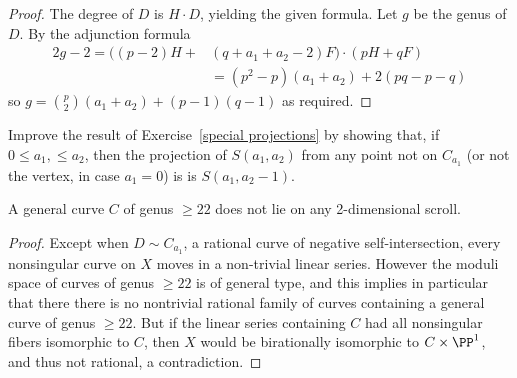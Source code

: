 \begin{proof} The degree of $D$ is $H\cdot D$, yielding the given formula. Let $g$ be the genus of $D$. 
By the adjunction formula
\begin{align*}
2g-2 =  \bigl((p-2)H+&(q+a_{1}+a_{2}-2)F\bigr)\cdot (pH+qF)\\ 
 &= (p^{2}-p)(a_{1}+a_{2})+2(pq-p-q)
\end{align*}
so $g = {p\choose 2}(a_{1}+a_{2}) + (p-1)(q-1)$ as required.
\end{proof}

\begin{exercise}\label{general projections}
Improve the result of Exercise~\ref{special projections} by showing that, if $0\leq a_1,\leq a_2$, then
 the projection of $S(a_1,a_2)$ from any point not on $C_{a_1}$ (or not the vertex, in case $a_1=0$) is 
 is $S(a_1, a_2-1)$.
\end{exercise}
\begin{fact}
A general curve $C$ of  genus $\geq 22$ does not lie on any 2-dimensional scroll.
\end{fact}
\begin{proof}
Except when $D\sim C_{a_{1}}$, a rational curve of negative self-intersection, every nonsingular curve on $X$ moves in a non-trivial linear series. However the moduli space of curves of genus $\geq 22$ is of general type, and this implies in particular that there there is no nontrivial rational family of curves containing a general curve of 
genus $\geq 22$. But if the linear series containing $C$ had all nonsingular fibers isomorphic to $C$, then
$X$ would be birationally isomorphic to $C\times \PP^{1}$, and thus not rational, a contradiction.
\end{proof}


